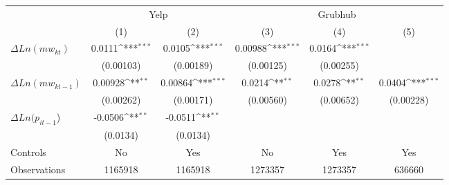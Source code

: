 {
\def\sym#1{\ifmmode^{#1}\else\(^{#1}\)\fi}
\begin{tabular}{l*{5}{c}}
\hline\hline
& \multicolumn{2}{c}{Yelp} & \multicolumn{3}{c}{Grubhub} \\
                    &\multicolumn{1}{c}{(1)}&\multicolumn{1}{c}{(2)}&\multicolumn{1}{c}{(3)}&\multicolumn{1}{c}{(4)}&\multicolumn{1}{c}{(5)}\\
\hline
$\Delta Ln(mw_{kt}) $&      0.0111\sym{***}&      0.0105\sym{***}&     0.00988\sym{***}&      0.0164\sym{***}&                     \\
                    &   (0.00103)         &   (0.00189)         &   (0.00125)         &   (0.00255)         &                     \\
[1em]
$\Delta Ln(mw_{kt-1}) $&     0.00928\sym{**} &     0.00864\sym{***}&      0.0214\sym{**} &      0.0278\sym{**} &      0.0404\sym{***}\\
                    &   (0.00262)         &   (0.00171)         &   (0.00560)         &   (0.00652)         &   (0.00228)         \\
[1em]
$\Delta Ln(p_{it-1}$)&     -0.0506\sym{**} &     -0.0511\sym{**} &                     &                     &                     \\
                    &    (0.0134)         &    (0.0134)         &                     &                     &                     \\
\hline
Controls & No & Yes & No & Yes & Yes \\
Observations        &     1165918         &     1165918         &     1273357         &     1273357         &      636660         \\
\hline\hline
\end{tabular}
}
